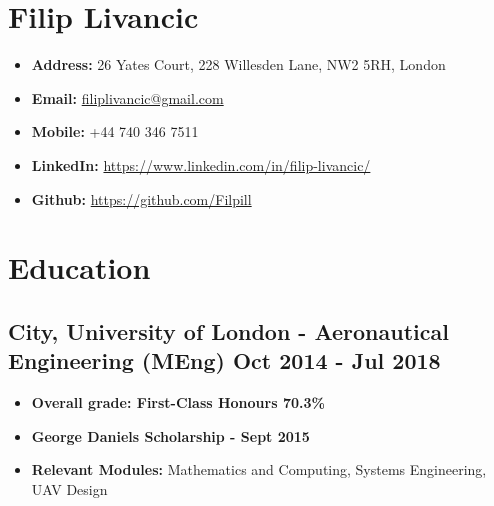 \documentclass[a4paper,9pt]{article}
\date{}
\begin{document}
\section*{Filip Livancic}

\begin{itemize}[noitemsep]
    \item\textbf{Address: }26 Yates Court, 228 Willesden Lane, NW2 5RH, London
    \item\textbf{Email: }\href{mailto:filiplivancic@gmail.com}{filiplivancic@gmail.com}
    \item\textbf{Mobile: }+44 740 346 7511
    \item\textbf{LinkedIn: }\url{https://www.linkedin.com/in/filip-livancic/}
    \item\textbf{Github: }\url{https://github.com/Filpill}
\end{itemize}






\section*{Education}
\subsection*{\textbf {City, University of London - Aeronautical Engineering (MEng)}  \hfill Oct 2014 - Jul 2018}\FloatBarrier
\begin{itemize}[noitemsep]
\item \textbf{Overall grade: First-Class Honours 70.3\%}
\item \textbf{George Daniels Scholarship - Sept 2015}
\item \textbf{Relevant Modules:} Mathematics and Computing, Systems Engineering, UAV Design
\end{itemize}

\end{document}
